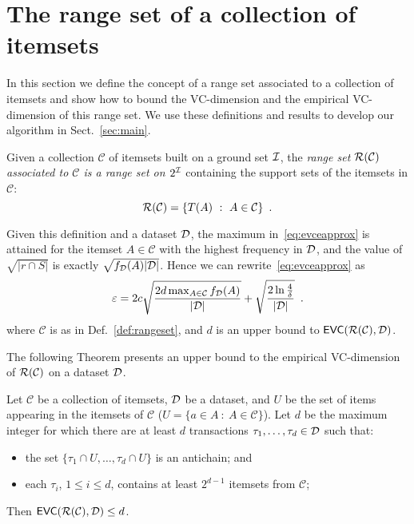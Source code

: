 \section{The range set of a collection of itemsets}\label{sec:range}
In this section we define the concept of a range set associated to a
collection of itemsets and show how to bound the VC-dimension and the
empirical VC-dimension of this range set. We use these definitions and results
to develop our algorithm in Sect.~\ref{sec:main}.

\begin{definition}\label{def:rangeset}
Given a collection $\mathcal{C}$ of itemsets built on a ground set ${\cal I}$, the
\emph{range set $\mathcal{R}(\mathcal{C})$ associated to $\mathcal{C}$ is a range
set on $2^{\cal I}$} containing the support sets of the itemsets in $\mathcal{C}$:
\[
	\mathcal{R}(\mathcal{C})=\{T(A) ~:~ A\in\mathcal{C}\}\enspace.
\]
\end{definition}

\begin{fact}\label{fact:maxfreq}
	Given this definition and a dataset ${\cal D}$, the maximum
	in~\eqref{eq:evceapprox} is attained for the itemset $A\in\mathcal{C}$ with the
	highest frequency in ${\cal D}$, and the value of $\sqrt{|r\cap S|}$ is exactly
	$\sqrt{f_{\cal D}(A)|{\cal D}|}$. Hence we can rewrite~\eqref{eq:evceapprox} as
	\begin{equation}\label{eq:evceapproxitemsets}
		\varepsilon = 2c\sqrt{\frac{2d\max_{A\in\mathcal{C}}f_{\cal D}(A)}{|{\cal D}|}} +
		\sqrt{\frac{2\ln\frac{4}{\delta}}{|{\cal D}|}}\enspace.
	\end{equation}
	where $\mathcal{C}$ is as in Def.~\ref{def:rangeset}, and $d$ is an
	upper bound to $\mathsf{EVC}(\mathcal{R}(\mathcal{C}),{\cal D})$.
\end{fact}

The following Theorem presents an upper bound to the empirical VC-dimension of
$\mathcal{R}(\mathcal{C})$ on a dataset ${\cal D}$.

\begin{theorem}\label{lem:evcdimupbound}
  Let $\mathcal{C}$ be a collection of itemsets, ${\cal D}$ be a dataset, and $U$ be
  the set of items appearing in the itemsets of $\mathcal{C}$ ($U=\{a\in A ~:~
  A\in\mathcal{C}\}$). Let $d$ be the maximum integer for which there are at
  least $d$ transactions $\tau_1,\dotsc,\tau_d\in {\cal D}$ such that:
  \begin{itemize}
	\item the set $\{\tau_1\cap U,\dotsc,\tau_d\cap U\}$ is an antichain; and
	\item each $\tau_i$, $1\le i\le d$, contains at least $2^{d-1}$ itemsets
		from $\mathcal{C}$;
  \end{itemize}
  Then $\mathsf{EVC}(\mathcal{R}(\mathcal{C}),{\cal D})\le d$.
\end{theorem}

